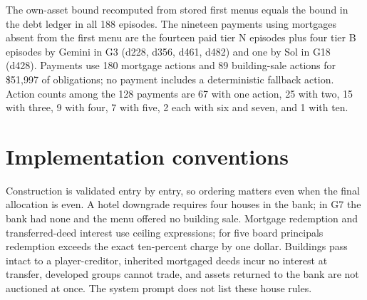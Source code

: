 The own-asset bound recomputed from stored first menus equals the bound in the debt ledger in all 188 episodes. The nineteen payments using mortgages absent from the first menu are the fourteen paid tier N episodes plus four tier B episodes by Gemini in G3 (d228, d356, d461, d482) and one by Sol in G18 (d428). Payments use 180 mortgage actions and 89 building-sale actions for \$51,997 of obligations; no payment includes a deterministic fallback action. Action counts among the 128 payments are 67 with one action, 25 with two, 15 with three, 9 with four, 7 with five, 2 each with six and seven, and 1 with ten.

\FloatBarrier
\section{Implementation conventions}
\label{app:rules}
Construction is validated entry by entry, so ordering matters even when the final allocation is even. A hotel downgrade requires four houses in the bank; in G7 the bank had none and the menu offered no building sale. Mortgage redemption and transferred-deed interest use ceiling expressions; for five board principals redemption exceeds the exact ten-percent charge by one dollar. Buildings pass intact to a player-creditor, inherited mortgaged deeds incur no interest at transfer, developed groups cannot trade, and assets returned to the bank are not auctioned at once. The system prompt does not list these house rules.

\FloatBarrier
